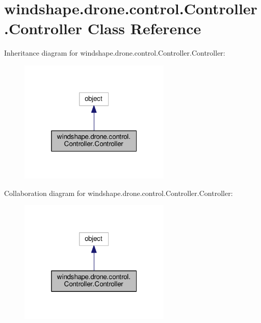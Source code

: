 \hypertarget{classwindshape_1_1drone_1_1control_1_1_controller_1_1_controller}{}\section{windshape.\+drone.\+control.\+Controller.\+Controller Class Reference}
\label{classwindshape_1_1drone_1_1control_1_1_controller_1_1_controller}


Inheritance diagram for windshape.\+drone.\+control.\+Controller.\+Controller\+:\nopagebreak
\begin{figure}[H]
\begin{center}
\leavevmode
\includegraphics[width=205pt]{classwindshape_1_1drone_1_1control_1_1_controller_1_1_controller__inherit__graph}
\end{center}
\end{figure}


Collaboration diagram for windshape.\+drone.\+control.\+Controller.\+Controller\+:\nopagebreak
\begin{figure}[H]
\begin{center}
\leavevmode
\includegraphics[width=205pt]{classwindshape_1_1drone_1_1control_1_1_controller_1_1_controller__coll__graph}
\end{center}
\end{figure}
